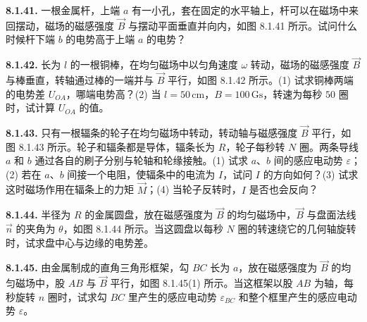 \vfill
\newpage

\textbf{8.1.41.} 一根金属杆，上端 $a$ 有一小孔，套在固定的水平轴上，杆可以在磁场中来回摆动，磁场的磁感强度 $\vec{B}$ 与摆动平面垂直并向内，如图 8.1.41 所示。试问什么时候杆下端 $b$ 的电势高于上端 $a$ 的电势？

\begin{center}
\end{center}

\vfill
\newpage

\textbf{8.1.42.} 长为 $l$ 的一根铜棒，在均匀磁场中以匀角速度 $\omega$ 转动，磁场的磁感强度 $\vec{B}$ 与棒垂直，转轴通过棒的一端并与 $\vec{B}$ 平行，如图 8.1.42 所示。(1) 试求铜棒两端的电势差 $U_{OA}$，哪端电势高？(2) 当 $l = 50\,\mathrm{cm}$，$B = 100\,\mathrm{Gs}$，转速为每秒 $50$ 圈时，试计算 $U_{OA}$ 的值。

\begin{center}
\end{center}

\vfill
\newpage

\textbf{8.1.43.} 只有一根辐条的轮子在均匀磁场中转动，转动轴与磁感强度 $\vec{B}$ 平行，如图 8.1.43 所示。轮子和辐条都是导体，辐条长为 $R$，轮子每秒转 $N$ 圈。两条导线 $a$ 和 $b$ 通过各自的刷子分别与轮轴和轮缘接触。(1) 试求 $a$、$b$ 间的感应电动势 $\varepsilon$；(2) 若在 $a$、$b$ 间接一个电阻，使辐条中的电流为 $I$，试问 $I$ 的方向如何？(3) 试求这时磁场作用在辐条上的力矩 $\vec{M}$；(4) 当轮子反转时，$I$ 是否也会反向？

\begin{center}
\end{center}

\vfill
\newpage

\textbf{8.1.44.} 半径为 $R$ 的金属圆盘，放在磁感强度为 $\vec{B}$ 的均匀磁场中，$\vec{B}$ 与盘面法线 $\vec{n}$ 的夹角为 $\theta$，如图 8.1.44 所示。当这圆盘以每秒 $N$ 圈的转速绕它的几何轴旋转时，试求盘中心与边缘的电势差。

\begin{center}
\end{center}

\vfill
\newpage

\textbf{8.1.45.} 由金属制成的直角三角形框架，勾 $BC$ 长为 $a$，放在磁感强度为 $\vec{B}$ 的均匀磁场中，股 $AB$ 与 $\vec{B}$ 平行，如图 8.1.45(1) 所示。当这框架以股 $AB$ 为轴，每秒旋转 $n$ 圈时，试求勾 $BC$ 里产生的感应电动势 $\varepsilon_{BC}$ 和整个框里产生的感应电动势 $\varepsilon$。

